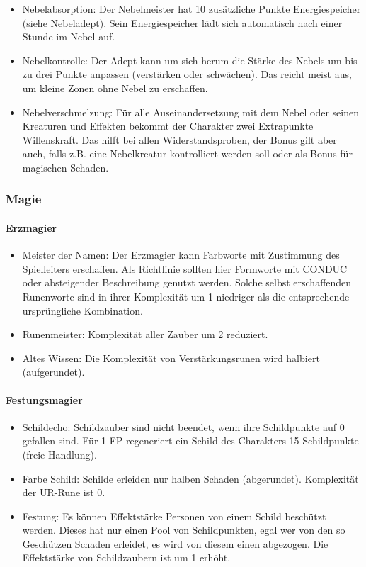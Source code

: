 \documentclass{article}
\begin{document}
\begin{itemize}
\item Nebelabsorption: Der Nebelmeister hat 10 zusätzliche Punkte Energiespeicher (siehe Nebeladept). Sein Energiespeicher lädt sich automatisch nach einer Stunde im Nebel auf.
\item Nebelkontrolle: Der Adept kann um sich herum die Stärke des Nebels um bis zu drei Punkte anpassen (verstärken oder schwächen). Das reicht meist aus, um kleine Zonen ohne Nebel zu erschaffen.
\item Nebelverschmelzung: Für alle Auseinandersetzung mit dem Nebel oder seinen Kreaturen und Effekten bekommt der Charakter zwei Extrapunkte Willenskraft. Das hilft bei allen Widerstandsproben, der Bonus gilt aber auch, falls z.B. eine Nebelkreatur kontrolliert werden soll oder als Bonus für magischen Schaden.
\end{itemize}

\subsubsection{Magie}

\paragraph{Erzmagier }

\begin{itemize}
\item Meister der Namen: Der Erzmagier kann Farbworte mit Zustimmung des Spielleiters erschaffen. Als Richtlinie sollten hier Formworte mit CONDUC oder absteigender Beschreibung genutzt werden. Solche selbst erschaffenden Runenworte sind in ihrer Komplexität um 1 niedriger als die entsprechende ursprüngliche Kombination.
\item Runenmeister: Komplexität aller Zauber um 2 reduziert.
\item Altes Wissen: Die Komplexität von Verstärkungsrunen wird halbiert (aufgerundet).
\end{itemize}

\paragraph{Festungsmagier}

\begin{itemize}
\item Schildecho: Schildzauber sind nicht beendet, wenn ihre Schildpunkte auf 0 gefallen sind. Für 1 FP regeneriert ein Schild des Charakters 15 Schildpunkte (freie Handlung).
\item Farbe Schild: Schilde erleiden nur halben Schaden (abgerundet). Komplexität der UR-Rune ist 0.
\item Festung: Es können Effektstärke Personen von einem Schild beschützt werden. Dieses hat nur einen Pool von Schildpunkten, egal wer von den so Geschützen Schaden erleidet, es wird von diesem einen abgezogen. Die Effektstärke von Schildzaubern ist um 1 erhöht.
\end{itemize}
\end{document}
